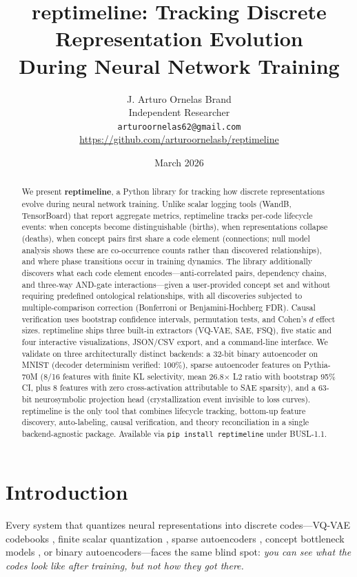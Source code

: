 \documentclass[11pt]{article}
\title{\textbf{reptimeline}: Tracking Discrete Representation Evolution\\During Neural Network Training}
\author{J. Arturo Ornelas Brand\\
Independent Researcher\\
\texttt{arturoornelas62@gmail.com}\\
\url{https://github.com/arturoornelasb/reptimeline}
}
\date{March 2026}
\begin{document}
\maketitle

\begin{abstract}
We present \textbf{reptimeline}, a Python library for tracking how discrete representations evolve during neural network training. Unlike scalar logging tools (WandB, TensorBoard) that report aggregate metrics, reptimeline tracks per-code lifecycle events: when concepts become distinguishable (births), when representations collapse (deaths), when concept pairs first share a code element (connections; null model analysis shows these are co-occurrence counts rather than discovered relationships), and where phase transitions occur in training dynamics. The library additionally discovers what each code element encodes---anti-correlated pairs, dependency chains, and three-way AND-gate interactions---given a user-provided concept set and without requiring predefined ontological relationships, with all discoveries subjected to multiple-comparison correction (Bonferroni or Benjamini-Hochberg FDR). Causal verification uses bootstrap confidence intervals, permutation tests, and Cohen's $d$ effect sizes. reptimeline ships three built-in extractors (VQ-VAE, SAE, FSQ), five static and four interactive visualizations, JSON/CSV export, and a command-line interface. We validate on three architecturally distinct backends: a 32-bit binary autoencoder on MNIST (decoder determinism verified: 100\%), sparse autoencoder features on Pythia-70M (8/16 features with finite KL selectivity, mean 26.8$\times$ L2 ratio with bootstrap 95\% CI, plus 8 features with zero cross-activation attributable to SAE sparsity), and a 63-bit neurosymbolic projection head (crystallization event invisible to loss curves). reptimeline is the only tool that combines lifecycle tracking, bottom-up feature discovery, auto-labeling, causal verification, and theory reconciliation in a single backend-agnostic package. Available via \texttt{pip install reptimeline} under BUSL-1.1.
\end{abstract}


\section{Introduction}
\label{sec:intro}

Every system that quantizes neural representations into discrete codes---VQ-VAE codebooks \citep{vandenoord2017neural}, finite scalar quantization \citep{mentzer2024finite}, sparse auto\-encoders \citep{cunningham2023sparse, sharkey2022taking, bricken2023monosemanticity}, concept bottleneck models \citep{koh2020concept}, or binary autoencoders---faces the same blind spot: \emph{you can see what the codes look like after training, but not how they got there.}
\end{document}
